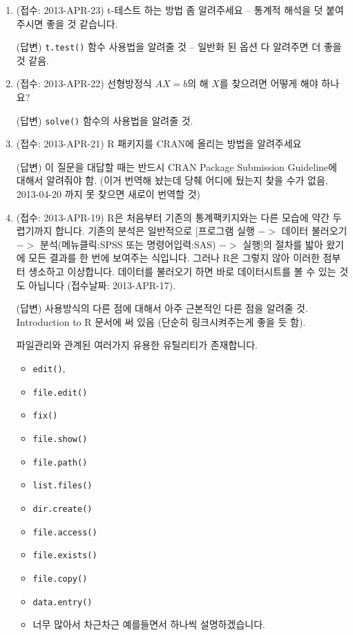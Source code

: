 \documentclass{article}
\begin{document}
\begin{enumerate}
	
	\item (접수: 2013-APR-23) t-테스트 하는 방법 좀 알려주세요 -- 통계적 해석을 덧 붙여주시면 좋을 것 같습니다.
	
	\textsf{(답변)} \texttt{t.test()} 함수 사용법을 알려줄 것 -- 일반화 된 옵션 다 알려주면 더 좋을 것 같음. 
	
	\item (접수: 2013-APR-22) 선형방정식 $AX=b$의 해 $X$를 찾으려면 어떻게 해야 하나요? 
	
	\textsf{(답변)} \texttt{solve()} 함수의 사용법을 알려줄 것.
	
	\item (접수: 2013-APR-21) R 패키지를 CRAN에 올리는 방법을 알려주세요 
	
	\textsf{(답변)} 이 질문을 대답할 때는 반드시 CRAN Package Submission Guideline에 대해서 알려줘야 함.  (이거 번역해 놨는데 당췌 어디에 뒀는지 찾을 수가 없음, 2013-04-20 까지 못 찾으면 새로이 번역할 것)
	
	\item (접수: 2013-APR-19) R은 처음부터 기존의 통계팩키지와는 다른 모습에 약간 두렵기까지 합니다.  기존의 분석은 일반적으로 $[$프로그램 실행 $->$ 데이터 불러오기 $->$ 분석(메뉴클릭:SPSS 또는 명령어입력:SAS) $->$ 실행$]$의 절차를 밟아 왔기에 모든 결과를 한 번에 보여주는 식입니다. 그러나 R은 그렇지 않아 이러한 점부터 생소하고 이상합니다.  데이터를 불러오기 하면 바로 데이터시트를 볼 수 있는 것도 아닙니다 (접수날짜: 2013-APR-17).

	\textsf{(답변)} 사용방식의 다른 점에 대해서 아주 근본적인 다른 점을 알려줄 것.  Introduction to R 문서에 써 있음 (단순히 링크시켜주는게 좋을 듯 함). 
	
	파일관리와 관계된 여러가지 유용한 유틸리티가 존재합니다. 
	\begin{itemize}
		\item \texttt{edit()},
		\item \texttt{file.edit()}
		\item \texttt{fix()}
		\item \texttt{file.show()}
		\item \texttt{file.path()}
		\item \texttt{list.files()}
		\item \texttt{dir.create()}
		\item \texttt{file.access()}
		\item \texttt{file.exists()}
		\item \texttt{file.copy()}
		\item \texttt{data.entry()}
		\item 너무 많아서 차근차근 예를들면서 하나씩 설명하겠습니다. 
	\end{itemize}
	


\end{enumerate}
\end{document}
